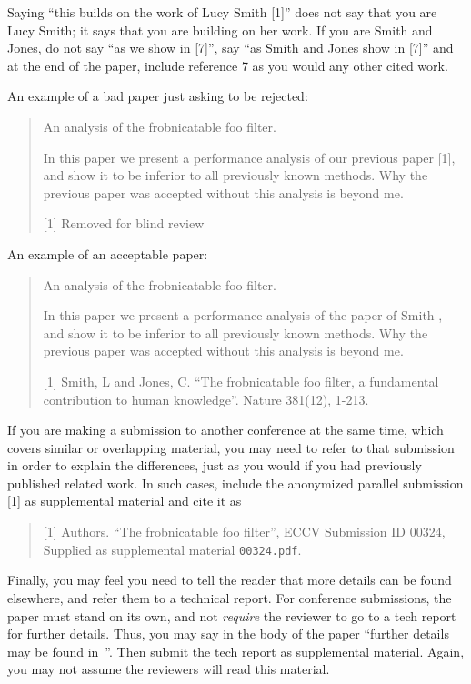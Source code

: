 \documentclass[runningheads]{llncs}
\begin{document}
Saying ``this builds on the work of Lucy Smith [1]'' does not say that you are Lucy Smith;
it says that you are building on her work.
If you are Smith and Jones, do not say ``as we show in [7]'', say ``as Smith and Jones show in [7]'' and at the end of the paper, include reference 7 as you would any other cited work.

An example of a bad paper just asking to be rejected:
\begin{quote}
  \begin{center}
      An analysis of the frobnicatable foo filter.
  \end{center}

   In this paper we present a performance analysis of our previous paper [1], and show it to be inferior to all previously known methods.
   Why the previous paper was accepted without this analysis is beyond me.

   [1] Removed for blind review
\end{quote}

An example of an acceptable paper:
\begin{quote}
  \begin{center}
     An analysis of the frobnicatable foo filter.
  \end{center}

   In this paper we present a performance analysis of the  paper of Smith \etal [1], and show it to be inferior to all previously known methods.
   Why the previous paper was accepted without this analysis is beyond me.

   [1] Smith, L and Jones, C. ``The frobnicatable foo filter, a fundamental contribution to human knowledge''. Nature 381(12), 1-213.
\end{quote}

If you are making a submission to another conference at the same time, which covers similar or overlapping material, you may need to refer to that submission in order to explain the differences, just as you would if you had previously published related work.
In such cases, include the anonymized parallel submission [1] as supplemental material and cite it as
\begin{quote}
  [1] Authors. ``The frobnicatable foo filter'', ECCV \ECCVyear Submission ID 00324, Supplied as supplemental material {\tt 00324.pdf}.
\end{quote}

Finally, you may feel you need to tell the reader that more details can be found elsewhere, and refer them to a technical report.
For conference submissions, the paper must stand on its own, and not \emph{require} the reviewer to go to a tech report for further details.
Thus, you may say in the body of the paper ``further details may be found in~\cite{Anonymous24b}''.
Then submit the tech report as supplemental material.
Again, you may not assume the reviewers will read this material.
\end{document}
